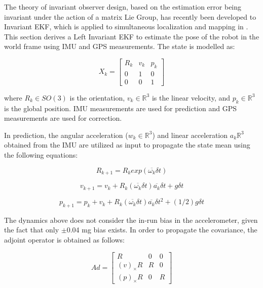

The theory of invariant observer design, based on the estimation error being invariant under the action of a matrix Lie Group, has recently been developed to Invariant EKF, which is applied to simultaneous localization and mapping in \cite{hartley2018contact}. This section derives a Left Invariant EKF to estimate the pose of the robot in the world frame using IMU and GPS measurements. The state is modelled as:

\begin{equation}
    X_{k} = 
    \begin{bmatrix}
    R_{k} & v_{k} & p_{k} \\
    0 & 1 & 0 \\
    0 & 0 & 1
    \end{bmatrix}
\end{equation}

where $R_{k} \in SO(3)$ is the orientation, $v_{k} \in \mathbb{R}^3$ is the linear velocity, and $p_{k} \in \mathbb{R}^3$ is the global position. IMU measurements are used for prediction and GPS measurements are used for correction.

In prediction, the angular acceleration ($w_{k} \in \mathbb{R}^3$) and linear acceleration $a_{k} \mathbb{R}^3$ obtained from the IMU are utilized as input to propagate the state mean using the following equations:

\begin{equation}
    R_{k+1}=R_{k}exp(\overline{\omega_{k}}\delta t)
\end{equation}

\begin{equation}
    v_{k+1}=v_{k}+R_{k}(\overline{\omega_{k}}\delta t)\overline{a_{k}}\delta t+g \delta t
\end{equation}

\begin{equation}
    p_{k+1}=p_{k}+v_{k}+R_{k}(\overline{\omega_{k}}\delta t)\overline{a_{k}}\delta t^{2}+(1/2)g \delta t
\end{equation}

The dynamics above does not consider the in-run bias in the accelerometer, given the fact that only $\pm$0.04 mg bias exists. In order to propagate the covariance, the adjoint operator is obtained as follows:

\begin{equation}
    Ad = 
    \begin{bmatrix}
    R & 0 & 0   \\
    (v)_{\times}R & R & 0  \\
    (p)_{\times}R & 0 & R 
    \end{bmatrix}
\end{equation}

